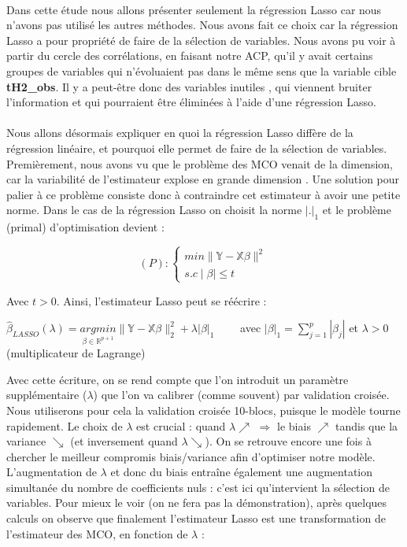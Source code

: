 \documentclass[14pt, openany]{article}
\begin{document}
\paragraph{}
Dans cette étude nous allons présenter seulement la régression Lasso car nous n'avons pas utilisé les autres méthodes. Nous avons fait ce choix car la régression Lasso a pour propriété de faire de la sélection de variables. Nous avons pu voir à partir du cercle des corrélations, en faisant notre ACP, qu'il y avait certains groupes de variables qui n'évoluaient pas dans le même sens que la variable cible \textbf{tH2\_obs}. Il y a peut-être donc des variables \og inutiles \fg{}, qui viennent bruiter l'information et qui pourraient être éliminées à l'aide d'une régression Lasso.
\paragraph{}
Nous allons désormais expliquer en quoi la régression Lasso diffère de la régression linéaire, et pourquoi elle permet de faire de la sélection de variables. Premièrement, nous avons vu que le problème des MCO venait de la dimension, car la variabilité de l'estimateur \og explose \fg{} en grande dimension . Une solution pour palier à ce problème consiste donc à contraindre cet estimateur à avoir une \og petite \fg{} norme. Dans le cas de la régression Lasso on choisit la norme $|.|_1$ et le problème (primal) d'optimisation devient :
\begin{center}
$$
(P) :\left\{
    \begin{array}{ll}
        min \parallel \mathbb{Y} - \mathbb{X}\beta \parallel^2  \\
        s.c  \mid\beta\mid\leq t
    \end{array}
\right.
$$
\end{center}
Avec $t>0$. Ainsi, l'estimateur Lasso peut se réécrire :
\begin{center}
$\hat{\beta}_{LASSO}(\lambda) = \underset{\beta\in\mathbb{R}^{p+1} }{argmin}\parallel \mathbb{Y} - \mathbb{X}\beta \parallel^2_2 + \lambda |\beta|_1 \qquad$ avec $|\beta|_1 = \sum\limits_{j=1}^p|\beta_j|$ et $\lambda > 0$ (multiplicateur de Lagrange)
\end{center}
Avec cette écriture, on se rend compte que l'on introduit un paramètre supplémentaire ($\lambda$) que l'on va calibrer (comme souvent) par validation croisée. Nous utiliserons pour cela la validation croisée 10-blocs, puisque le modèle tourne rapidement. Le choix de $\lambda$ est crucial : quand $\lambda \nearrow$ $ \Rightarrow$ le biais $\nearrow$ tandis que la variance $\searrow$ (et inversement quand $\lambda \searrow$). On se retrouve encore une fois à chercher le \og meilleur \fg{} compromis biais/variance afin d'optimiser notre modèle. L'augmentation de $\lambda$ et donc du biais entraîne également une augmentation simultanée du nombre de coefficients nuls : c'est ici qu'intervient la sélection de variables. Pour mieux le voir (on ne fera pas la démonstration), après quelques calculs on observe que finalement l'estimateur Lasso est une transformation de l'estimateur des MCO, en fonction de $\lambda$ :
\end{document}

